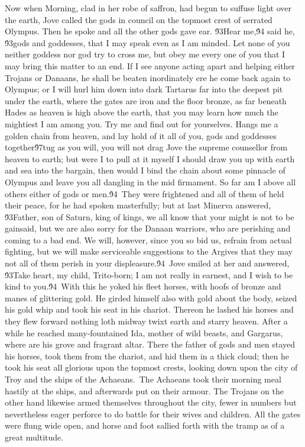 {  Now when Morning, clad in her robe of saffron, had begun to suffuse light over the earth, Jove called the gods in council on the topmost crest of serrated Olympus. Then he spoke and all the other gods gave ear. \'93Hear me,\'94 said he, \'93gods and goddesses, that I may speak even as I am minded. Let none of you neither goddess nor god try to cross me, but obey me every one of you that I may bring this matter to an end. If I see anyone acting apart and helping either Trojans or Danaans, he shall be beaten inordinately ere he come back again to Olympus; or I will hurl him down into dark Tartarus far into the deepest pit under the earth, where the gates are iron and the floor bronze, as far beneath Hades as heaven is high above the earth, that you may learn how much the mightiest I am among you. Try me and find out for yourselves. Hangs me a golden chain from heaven, and lay hold of it all of you, gods and goddesses together\'97tug as you will, you will not drag Jove the supreme counsellor from heaven to earth; but were I to pull at it myself I should draw you up with earth and sea into the bargain, then would I bind the chain about some pinnacle of Olympus and leave you all dangling in the mid firmament. So far am I above all others either of gods or men.\'94\
They were frightened and all of them of held their peace, for he had spoken masterfully; but at last Minerva answered, \'93Father, son of Saturn, king of kings, we all know that your might is not to be gainsaid, but we are also sorry for the Danaan warriors, who are perishing and coming to a bad end. We will, however, since you so bid us, refrain from actual fighting, but we will make serviceable suggestions to the Argives that they may not all of them perish in your displeasure.\'94\
Jove smiled at her and answered, \'93Take heart, my child, Trito-born; I am not really in earnest, and I wish to be kind to you.\'94\
With this he yoked his fleet horses, with hoofs of bronze and manes of glittering gold. He girded himself also with gold about the body, seized his gold whip and took his seat in his chariot. Thereon he lashed his horses and they flew forward nothing loth midway twixt earth and starry heaven. After a while he reached many-fountained Ida, mother of wild beasts, and Gargarus, where are his grove and fragrant altar. There the father of gods and men stayed his horses, took them from the chariot, and hid them in a thick cloud; then he took his seat all glorious upon the topmost crests, looking down upon the city of Troy and the ships of the Achaeans.\
The Achaeans took their morning meal hastily at the ships, and afterwards put on their armour. The Trojans on the other hand likewise armed themselves throughout the city, fewer in numbers but nevertheless eager perforce to do battle for their wives and children. All the gates were flung wide open, and horse and foot sallied forth with the tramp as of a great multitude.\
}
